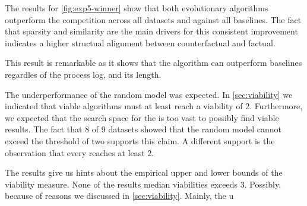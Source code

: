 \documentclass[./../../paper.tex]{subfiles}
\begin{document}
The results for \autoref{fig:exp5-winner} show that both evolutionary algorithms outperform the competition across all datasets and against all baselines. The fact that sparsity and similarity are the main drivers for this consistent improvement indicates a higher structual alignment between counterfactual and factual. 

This result is remarkable as it shows that the algorithm can outperform baselines regardles of the process log, and its length.

The underperformance of the random model was expected. In \autoref{sec:viability} we indicated that viable algorithms must at least reach a viability of 2. 
Furthermore, we expected that the search space for the \ModelRNG is too vast to possibly find viable results. 
The fact that 8 of 9 datasets showed that the random model cannot exceed the threshold of two supports this claim. A different support is the observation that every \ModelCBG reaches at least 2.

The results give us hints about the empirical upper and lower bounds of the viability measure. None of the results median viabilities exceeds 3. Possibly, because of reasons we discussed in \autoref{sec:viability}. Mainly, the u  
\end{document}
